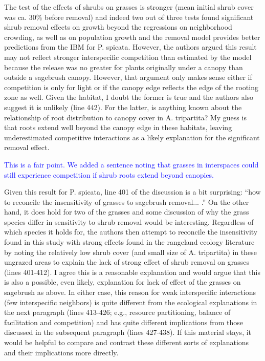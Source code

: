 \documentclass[12pt]{article}
\newcommand{\response}{\textcolor{blue}}
\begin{document}
The test of the effects of shrubs on grasses is stronger (mean initial shrub cover was ca. 30\% before
removal) and indeed two out of three tests found significant shrub removal effects on growth beyond
the regressions on neighborhood crowding, as well as on population growth and the removal model
provides better predictions from the IBM for P. spicata. However, the authors argued this result may
not reflect stronger interspecific competition than estimated by the model because the release was no
greater for plants originally under a canopy than outside a sagebrush canopy. However, that argument
only makes sense either if competition is only for light or if the canopy edge reflects the edge of the
rooting zone as well. Given the habitat, I doubt the former is true and the authors also suggest it is
unlikely (line 442). For the latter, is anything known about the relationship of root distribution to
canopy cover in A. tripartita? My guess is that roots extend well beyond the canopy edge in these
habitats, leaving underestimated competitive interactions as a likely explanation for the significant
removal effect.

\response{This is a fair point. We added a sentence noting that grasses in interspaces 
could still experience competition if shrub roots extend beyond canopies.}

Given this result for P. spicata, line 401 of the discussion is a bit surprising: ``how to reconcile the
insensitivity of grasses to sagebrush removal... .'' On the other hand, it does hold for two of the grasses
and some discussion of why the grass species differ in sensitivity to shrub removal would be interesting.
Regardless of which species it holds for, the authors then attempt to reconcile the insensitivity found in
this study with strong effects found in the rangeland ecology literature by noting the relatively low shrub
cover (and small size of A. tripartita) in these ungrazed areas to explain the lack of strong effect of shrub
removal on grasses (lines 401-412). I agree this is a reasonable explanation and would argue that this is
also a possible, even likely, explanation for lack of effect of the grasses on sagebrush as above. In either
case, this reason for weak interspecific interactions (few interspecific neighbors) is quite different from
the ecological explanations in the next paragraph (lines 413-426; e.g., resource partitioning, balance of
facilitation and competition) and has quite different implications from those discussed in the
subsequent paragraph (lines 427-438). If this material stays, it would be helpful to compare and
contrast these different sorts of explanations and their implications more directly.
\end{document}
